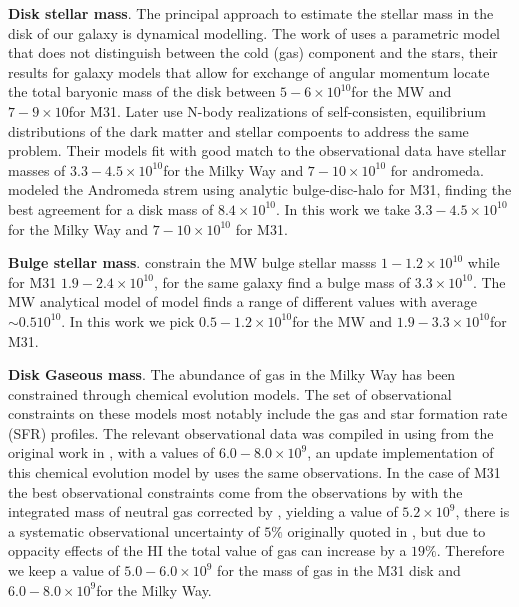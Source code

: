 \documentclass[usenatbib]{mn2e}
\newcommand{\Msun}{{\ifmmode{{\rm {M_{\odot}}}}\else{${\rm{M_{\odot}}}$}\fi}}
\begin{document}
{\bf Disk stellar mass}. The principal approach to estimate the stellar mass in the disk of our galaxy is dynamical modelling. The work of \cite{Klypin2002} uses a parametric model
 that does not distinguish between the cold (gas) component and the stars, their results for galaxy models that allow for exchange of angular momentum locate the total baryonic mass
 of the disk between $5-6\times 10^{10}$\Msun for the MW and $7-9\times 10$\Msun for M31. Later \cite{Widrow2005} use N-body realizations of self-consisten, equilibrium distributions 
of the dark matter and stellar compoents to address the same problem. Their models fit with good match to the observational data have stellar masses of $3.3-4.5\times 10^{10}$\Msun for 
the Milky Way and $7-10\times 10^{10}$ for andromeda. \citep{Geehan2006} modeled the Andromeda strem using analytic bulge-disc-halo for M31, finding the best agreement for a disk 
mass of $8.4\times 10^{10}$\Msun. In this work we take $3.3-4.5\times 10^{10}$\Msun for the Milky Way and $7-10\times 10^{10}$ for M31.  

{\bf Bulge stellar mass}. \cite{Klypin2002} constrain the MW bulge stellar masss $1-1.2\times 10^{10}$ \Msun while for M31 $1.9-2.4\times 10^{10}$, for the same galaxy 
\citep{Geehan2006} find a bulge mass of $3.3\times 10^{10}$\Msun. The MW analytical model of model \citep{Dehnen1998} finds a range of different values with average 
$\sim 0.5 10^{10}$\Msun. In this work we pick $0.5-1.2 \times 10^{10}$\Msun for the MW and $1.9-3.3\times 10^{10}$\Msun for M31.

{\bf Disk Gaseous mass}. The abundance of gas in the Milky Way has been constrained through chemical evolution models. The set of observational constraints on these models most 
notably include the gas and star formation rate (SFR) profiles. The relevant observational data was compiled in \citep{Boissier99} using from the original work in 
\cite{Kulkarni87,Dame93}, with a values of $6.0-8.0 \times 10^{9}$\Msun, an update implementation of this chemical evolution model by \citep{Yin09} uses the same observations. 
In the case of M31 the best observational constraints come from the observations by \citep{Cram80} with the integrated mass of neutral gas corrected by \citep{Dame93}, yielding a 
value of $5.2\times 10^{9}$\Msun, there is a systematic observational uncertainty of $5\%$ originally quoted in \citep{Cram80}, but due to oppacity effects of the HI \citep{Braun92}
 the total value of gas can increase by a $19\%$. Therefore we keep a value of $5.0-6.0\times 10^{9}$ for the mass of gas in the M31 disk and $6.0-8.0\times 10^{9}$\Msun for the
 Milky Way. 
\end{document}
